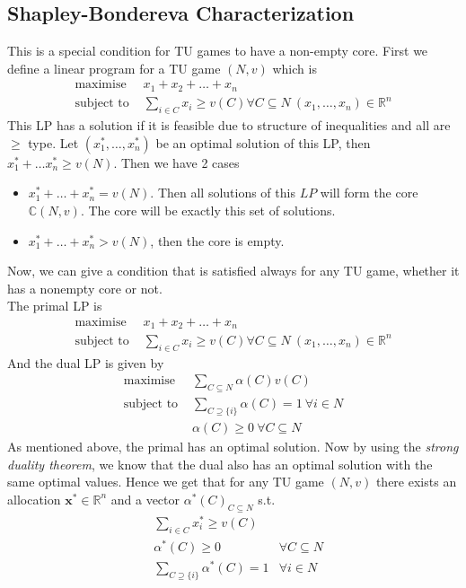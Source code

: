 \documentclass{article}
\theoremstyle{definition}
\begin{document}
\subsection{Shapley-Bondereva Characterization}
This is a special condition for TU games to have a non-empty core. First we define a linear program for a TU game $(N,v)$ which is
\begin{align*}
\text{maximise } & x_1+x_2+\dots+x_n\\
\text{subject to } & \sum_{i \in C} x_i \geq v(C) \forall C \subseteq N ~(x_1,\dots,x_n)\in \mathbb{R}^n
\end{align*}
This LP has a solution if it is feasible due to structure of inequalities and all are $\geq$ type. Let $(x_1^*,\dots,x_n^*)$ be an optimal solution of this LP, then $x_1^*+ \dots x_n^* \geq v(N)$. Then we have 2 cases
\begin{itemize}
	\item $x_1^* + \dots + x_n^* = v(N)$. Then all solutions of this $LP$ will form the core $\mathbb{C}(N,v)$. The core will be exactly this set of solutions.
	\item $x_1^* + \dots + x_n^* > v(N)$, then the core is empty.
\end{itemize}
Now, we can give a condition that is satisfied always for any TU game, whether it has a nonempty core or not.\\
The primal LP is
\begin{align*}
\text{maximise } & x_1+x_2+\dots+x_n\\
\text{subject to } & \sum_{i \in C} x_i \geq v(C) \forall C \subseteq N ~(x_1,\dots,x_n)\in \mathbb{R}^n
\end{align*}
And the dual LP is given by 
\begin{align*}
\text{maximise } & \sum_{C\subseteq N} \alpha(C)v(C)\\
\text{subject to } & \sum_{C\supseteq \{i\}} \alpha(C) = 1 ~\forall i \in N\\
&\alpha(C)\geq 0~\forall C \subseteq N
\end{align*}
As mentioned above, the primal has an optimal solution. Now by using the \textit{strong duality theorem}, we know that the dual also has an optimal solution with the same optimal values. Hence we get that for any TU game $(N,v)$ there exists an allocation $\mathbf{x}^*\in \mathbb{R}^n$ and a vector $\alpha^*(C)_{C\subseteq N}$ s.t.
\begin{align*}
&\sum_{i \in C}x_i^* \geq v(C)\\
& \alpha^*(C)\geq 0 & \forall C\subseteq N\\
&\sum_{C\supseteq\{i\}} \alpha^*(C) = 1 &\forall i \in N
\end{align*}
\end{document}
